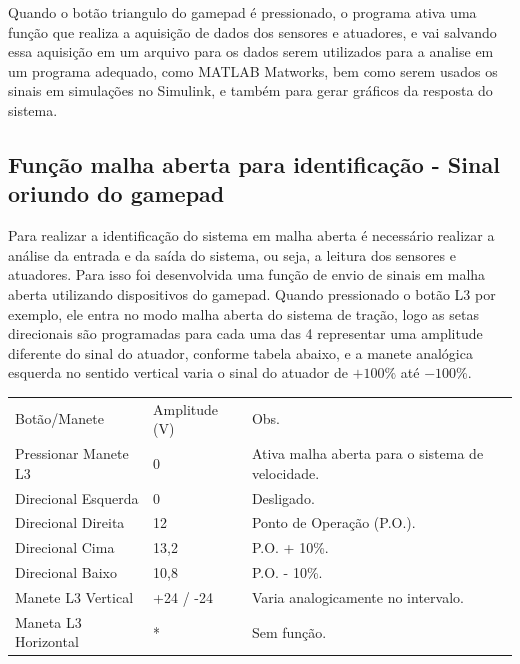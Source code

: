         Quando o botão triangulo do gamepad é pressionado, o programa ativa uma função que realiza a aquisição de dados dos sensores e atuadores, e vai salvando essa aquisição em um arquivo para os dados serem utilizados para a analise em um programa adequado, como MATLAB Matworks, bem como serem usados os sinais em simulações no Simulink, e também para gerar gráficos da resposta do sistema.
        
        \subsection{Função malha aberta para identificação - Sinal oriundo do gamepad}
        
            Para realizar a identificação do sistema em malha aberta é necessário realizar a análise da entrada e da saída do sistema, ou seja, a leitura dos sensores e atuadores. Para isso foi desenvolvida uma função de envio de sinais em malha aberta utilizando dispositivos do gamepad. Quando pressionado o botão L3 por exemplo, ele entra no modo malha aberta do sistema de tração, logo as setas direcionais são programadas para cada uma das 4 representar uma amplitude diferente do sinal do atuador, conforme tabela abaixo, e a manete analógica esquerda no sentido vertical varia o sinal do atuador de $+100\%$ até $-100\%$.
            
            \begin{table}[]
                \begin{tabular}{lll}
                    Botão/Manete          & Amplitude (V) & Obs.                                             \\
                    Pressionar Manete L3  & 0             & Ativa malha aberta para o sistema de velocidade. \\
                    Direcional Esquerda   & 0             & Desligado.                                       \\
                    Direcional Direita    & 12            & Ponto de Operação (P.O.).                        \\
                    Direcional Cima       & 13,2          & P.O. + 10\%.                                     \\
                    Direcional Baixo      & 10,8          & P.O. - 10\%.                                     \\
                    Manete L3 Vertical    & +24 / -24     & Varia analogicamente no intervalo.               \\
                    Maneta L3 Horizontal  & *             & Sem função.                                     
                \end{tabular}
            \end{table}
            
